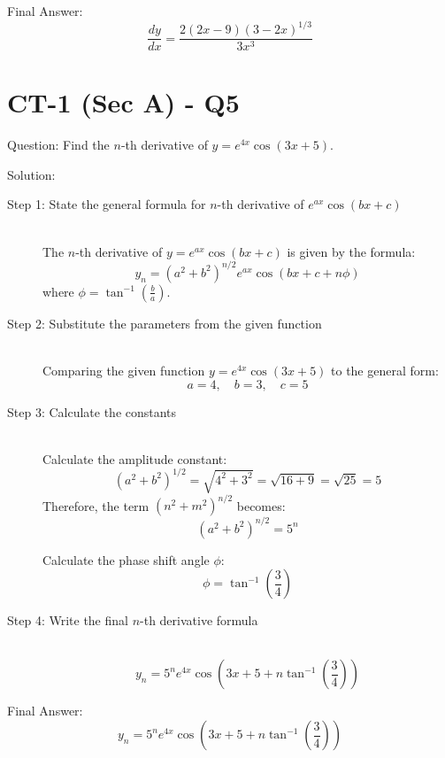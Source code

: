\documentclass[11pt, a4paper]{article}
\begin{document}
Final Answer:
\[ 
\boxed{\frac{dy}{dx} = \frac{2(2x - 9)(3-2x)^{1/3}}{3x^3}} 
\]



\section*{CT-1 (Sec A) - Q5}

Question:
Find the $n$-th derivative of $y = e^{4x}\cos(3x + 5)$.

Solution:

\begin{description}
    \item[Step 1: State the general formula for $n$-th derivative of $e^{ax}\cos(bx+c)$] \ \\
    The $n$-th derivative of $y = e^{ax}\cos(bx + c)$ is given by the formula:
    \[ y_n = (a^2 + b^2)^{n/2} e^{ax} \cos(bx + c + n\phi) \]
    where $\phi = \tan^{-1}\left(\frac{b}{a}\right)$.

    \item[Step 2: Substitute the parameters from the given function] \ \\
    Comparing the given function $y = e^{4x}\cos(3x + 5)$ to the general form:
    \[ a = 4, \quad b = 3, \quad c = 5 \]

    \item[Step 3: Calculate the constants] \ \\
    Calculate the amplitude constant:
    \[ (a^2 + b^2)^{1/2} = \sqrt{4^2 + 3^2} = \sqrt{16 + 9} = \sqrt{25} = 5 \]
    Therefore, the term $(n^2 + m^2)^{n/2}$ becomes:
    \[ (a^2 + b^2)^{n/2} = 5^n \]
    
    Calculate the phase shift angle $\phi$:
    \[ \phi = \tan^{-1}\left(\frac{3}{4}\right) \]

    \item[Step 4: Write the final $n$-th derivative formula] \ \\
    \[ y_n = 5^n e^{4x} \cos\left(3x + 5 + n\tan^{-1}\left(\frac{3}{4}\right)\right) \]
\end{description}

Final Answer:
\[ 
\boxed{y_n = 5^n e^{4x} \cos\left(3x + 5 + n\tan^{-1}\left(\frac{3}{4}\right)\right)} 
\]

\end{document}
